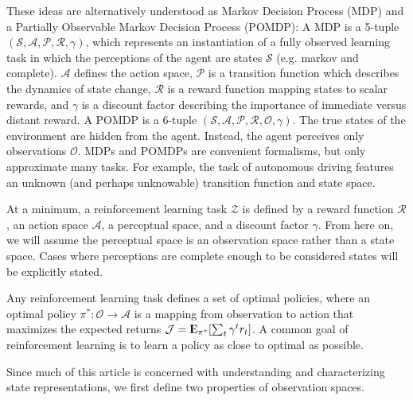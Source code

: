\documentclass{article} %
\newcommand{\Expect}{{\rm I\kern-.3em E}}
\theoremstyle{definition}
\begin{document}
These ideas are alternatively understood as Markov Decision Process
(MDP) and a Partially Observable Markov Decision Process (POMDP): A
MDP is a 5-tuple $(\mathcal{S}, \mathcal{A}, \mathcal{P}, \mathcal{R},
\gamma)$, which represents an instantiation of a fully observed
learning task in which the perceptions of the agent are states
$\mathcal{S}$ (e.g. markov and complete). $\mathcal{A}$ defines the
action space, $\mathcal{P}$ is a transition function which describes
the dynamics of state change, $\mathcal{R}$ is a reward function
mapping states to scalar rewards, and $\gamma$ is a discount factor
describing the importance of immediate versus distant reward. A POMDP
is a 6-tuple $(\mathcal{S}, \mathcal{A}, \mathcal{P}, \mathcal{R},
\mathcal{O}, \gamma)$. The true states of the environment are hidden
from the agent. Instead, the agent perceives only observations
$\mathcal{O}$. MDPs and POMDPs are convenient formalisms, but only
approximate many tasks. For example, the task of autonomous driving
features an unknown (and perhaps unknowable) transition function and
state space.

At a minimum, a reinforcement learning task $\mathcal{Z}$ is defined
by a reward function $\mathcal{R}$, an action space $\mathcal{A}$, a
perceptual space, and a discount factor $\gamma$. From here on, we
will assume the perceptual space is an observation space rather than a
state space. Cases where perceptions are complete enough to be
considered states will be explicitly stated.

Any reinforcement learning task defines a set of optimal policies,
where an optimal policy $\pi^*: \mathcal{O} \rightarrow \mathcal{A}$
is a mapping from observation to action that maximizes the expected
returns $\mathcal{J} = \Expect_{\pi^*}[\sum_{t} \gamma^t r_t]$. A
common goal of reinforcement learning is to learn a policy as close to
optimal as possible.

Since much of this article is concerned with understanding and
characterizing state representations, we first define two properties
of observation spaces.
\end{document}
